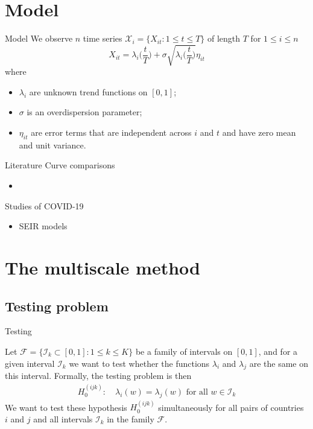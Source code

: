 \documentclass[10pt]{beamer}
\begin{document}
\section{Model}
\begin{frame}{Model}
We observe $n$ time series $\mathcal{X}_i = \{X_{it}: 1 \le t \le T \}$ of length $T$ for $1 \le i \le n$
\begin{equation*}\label{model}
X_{it} = \lambda_i \Big( \frac{t}{T} \Big) + \sigma\sqrt{\lambda_i \Big( \frac{t}{T} \Big)} \eta_{it} 
\end{equation*}\pause
\vspace{-3mm}
where
\begin{itemize}
\item $\lambda_i$ are unknown trend functions on $[0,1]$;
\item $\sigma$ is an overdispersion parameter;
\item $\eta_{it}$ are error terms that are independent across $i$ and $t$ and have zero mean and unit variance.
\end{itemize}
\end{frame}

\begin{frame}{Literature}
	Curve comparisons
	\begin{itemize}
		\item 
	\end{itemize}\pause
	Studies of COVID-19
	\begin{itemize}
		\item SEIR models
	\end{itemize}
\end{frame}

\section{The multiscale method}
\subsection{Testing problem}
\begin{frame}{Testing}

Let $\mathcal{F} =\{ \mathcal{I}_k \subset [0, 1]: 1 \le k \le K\}$ be a family of intervals on $[0, 1]$, and for a given interval $\mathcal{I}_k$ we want to test whether the functions $\lambda_i$ and $\lambda_j$ are the same on this interval. Formally, the testing problem is then
\begin{align*}
H_0^{(ijk)}:\quad  \lambda_i(w) = \lambda_j(w) \text{ for all } w\in \mathcal{I}_k
\end{align*}\pause
We want to test these hypothesis $H_0^{(ijk)}$ simultaneously for all pairs of countries $i$ and $j$ and all intervals $\mathcal{I}_k$ in the family $\mathcal{F}$.
\end{frame} 
\end{document}
